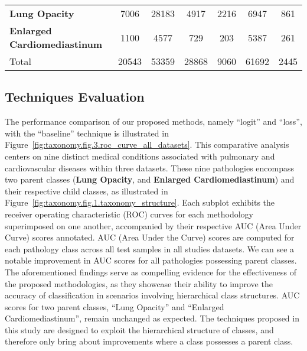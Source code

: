 \begin{table}[H]
\begin{tabular}{lcccccc}
\textbf{Lung Opacity} & 7006 & 28183 & \cellcolor[HTML]{E9ECE6}4917 & \cellcolor[HTML]{E9ECE6}2216 & \cellcolor[HTML]{E9ECE6}6947 & \cellcolor[HTML]{E9ECE6}861 \\
\textbf{Enlarged Cardiomediastinum} & 1100 & 4577 & \cellcolor[HTML]{E9ECE6}729 & \cellcolor[HTML]{E9ECE6}203 & \cellcolor[HTML]{E9ECE6}5387 & \cellcolor[HTML]{E9ECE6}261 \\
\rowcolor[HTML]{79A8A4}
{\color[HTML]{FFFFFF} Total} & {\color[HTML]{FFFFFF} 20543} & {\color[HTML]{FFFFFF} 53359} & {\color[HTML]{FFFFFF} 28868} & {\color[HTML]{FFFFFF} 9060} & {\color[HTML]{FFFFFF} 61692} & {\color[HTML]{FFFFFF} 2445}
\end{tabular}
\end{table}
%
\subsection{Techniques Evaluation}
The performance comparison of our proposed methods, namely ``logit'' and ``loss'', with the ``baseline'' technique is illustrated in Figure~\ref{fig:taxonomy.fig.3.roc_curve_all_datasets}. This comparative analysis centers on nine distinct medical conditions associated with pulmonary and cardiovascular diseases within three datasets. These nine pathologies encompass two parent classes (\textbf{Lung Opacity}, and \textbf{Enlarged Cardiomediastinum}) and their respective child classes, as illustrated in Figure~\ref{fig:taxonomy.fig.1.taxonomy_structure}. Each subplot exhibits the receiver operating characteristic (ROC) curves for each methodology superimposed on one another, accompanied by their respective AUC (Area Under Curve) scores annotated. AUC (Area Under the Curve) scores are computed for each pathology class across all test samples in all studies datasets. We can see a notable improvement in AUC scores for all pathologies possessing parent classes. The aforementioned findings serve as compelling evidence for the effectiveness of the proposed methodologies, as they showcase their ability to improve the accuracy of classification in scenarios involving hierarchical class structures. AUC scores for two parent classes, ``Lung Opacity'' and ``Enlarged Cardiomediastinum'', remain unchanged as expected. The techniques proposed in this study are designed to exploit the hierarchical structure of classes, and therefore only bring about improvements where a class possesses a parent class.


